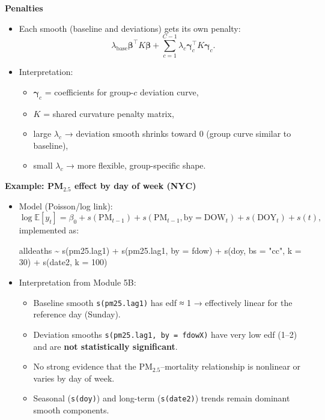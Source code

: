 \documentclass[
  letterpaper,
  DIV=11,
  numbers=noendperiod]{scrreprt}
\newenvironment{Shaded}{\begin{snugshade}}{\end{snugshade}}
\newcommand{\AttributeTok}[1]{\textcolor[rgb]{0.40,0.45,0.13}{#1}}
\newcommand{\DecValTok}[1]{\textcolor[rgb]{0.68,0.00,0.00}{#1}}
\newcommand{\FunctionTok}[1]{\textcolor[rgb]{0.28,0.35,0.67}{#1}}
\newcommand{\NormalTok}[1]{\textcolor[rgb]{0.00,0.23,0.31}{#1}}
\newcommand{\SpecialCharTok}[1]{\textcolor[rgb]{0.37,0.37,0.37}{#1}}
\newcommand{\StringTok}[1]{\textcolor[rgb]{0.13,0.47,0.30}{#1}}
\providecommand{\tightlist}{%
  \setlength{\itemsep}{0pt}\setlength{\parskip}{0pt}}\usepackage{longtable,booktabs,array}
\begin{document}
\textbf{Penalties}

\begin{itemize}
\tightlist
\item
  Each smooth (baseline and deviations) gets its own penalty: \[
  \lambda_{\text{base}} \boldsymbol{\beta}^\top K \boldsymbol{\beta}
  + \sum_{c=1}^{C-1} \lambda_c \boldsymbol{\gamma}_c^\top K \boldsymbol{\gamma}_c.
  \]
\item
  Interpretation:

  \begin{itemize}
  \tightlist
  \item
    \(\boldsymbol{\gamma}_c\) = coefficients for group-\(c\) deviation
    curve,
  \item
    \(K\) = shared curvature penalty matrix,
  \item
    large \(\lambda_c\) → deviation smooth shrinks toward 0 (group curve
    similar to baseline),
  \item
    small \(\lambda_c\) → more flexible, group-specific shape.
  \end{itemize}
\end{itemize}

\textbf{Example: PM\(_{2.5}\) effect by day of week (NYC)}

\begin{itemize}
\item
  Model (Poisson/log link): \[
  \log \mathbb{E}[y_t]
  = \beta_0
  + s(\text{PM}_{t-1})
  + s(\text{PM}_{t-1},\text{by}=\text{DOW}_t)
  + s(\text{DOY}_t)
  + s(t),
  \] implemented as:

\begin{Shaded}
\begin{Highlighting}[]
\NormalTok{alldeaths }\SpecialCharTok{\textasciitilde{}}
  \FunctionTok{s}\NormalTok{(pm25.lag1) }\SpecialCharTok{+}
  \FunctionTok{s}\NormalTok{(pm25.lag1, }\AttributeTok{by =}\NormalTok{ fdow) }\SpecialCharTok{+}
  \FunctionTok{s}\NormalTok{(doy, }\AttributeTok{bs =} \StringTok{"cc"}\NormalTok{, }\AttributeTok{k =} \DecValTok{30}\NormalTok{) }\SpecialCharTok{+}
  \FunctionTok{s}\NormalTok{(date2, }\AttributeTok{k =} \DecValTok{100}\NormalTok{)}
\end{Highlighting}
\end{Shaded}
\item
  Interpretation from Module 5B:

  \begin{itemize}
  \tightlist
  \item
    Baseline smooth \texttt{s(pm25.lag1)} has edf ≈ 1 → effectively
    linear for the reference day (Sunday).
  \item
    Deviation smooths \texttt{s(pm25.lag1,\ by\ =\ fdowX)} have very low
    edf (1--2) and are \textbf{not statistically significant}.
  \item
    No strong evidence that the PM\(_{2.5}\)--mortality relationship is
    nonlinear or varies by day of week.
  \item
    Seasonal (\texttt{s(doy)}) and long-term (\texttt{s(date2)}) trends
    remain dominant smooth components.
  \end{itemize}
\end{itemize}
\end{document}
